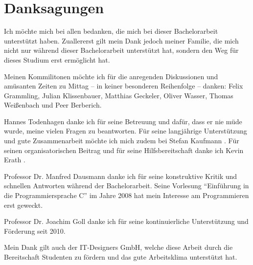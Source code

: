 
\chapter*{Danksagungen}

Ich möchte mich bei allen bedanken, die mich bei dieser Bachelorarbeit unterstützt haben.
Zuallererst gilt mein Dank jedoch meiner Familie, die mich nicht nur während dieser Bachelorarbeit unterstützt hat, sondern den Weg für dieses Studium erst ermöglicht hat.

Meinen Kommilitonen möchte ich für die anregenden Diskussionen und amüsanten Zeiten zu Mittag -- in keiner besonderen Reihenfolge -- danken:
Felix Grammling,
Julian Klissenbauer,
Matthias Geckeler,
Oliver Wasser,
Thomas Weißenbach und
Peer Berberich.



Hannes Todenhagen danke ich für seine Betreuung und dafür, dass er nie müde wurde, meine vielen Fragen zu beantworten.
Für seine langjährige Unterstützung und gute Zusammenarbeit möchte ich mich zudem bei Stefan Kaufmann
.
Für seinen organisatorischen Beitrag und für seine Hilfsbereitschaft danke ich Kevin Erath
.

Professor Dr. Manfred Dausmann danke ich für seine konstruktive Kritik und schnellen Antworten während der Bachelorarbeit. Seine Vorlesung \enquote{Einführung in die Programmiersprache C} im Jahre 2008 hat mein Interesse am Programmieren erst geweckt.

Professor Dr. Joachim Goll danke ich für seine kontinuierliche Unterstützung und Förderung seit 2010.

Mein Dank gilt auch der IT-Designers GmbH, welche diese Arbeit durch die Bereitschaft Studenten zu fördern und das gute Arbeitsklima unterstützt hat.
